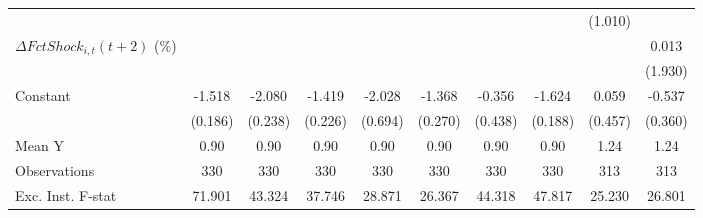 {\begin{tabular}{l*{9}{c}}
                    &                     &                     &                     &                     &                     &                     &                     &     (1.010)         &                     \\
\addlinespace
$ \Delta FctShock_{i,t}(t+2)$ (\%)&                     &                     &                     &                     &                     &                     &                     &                     &       0.013         \\
                    &                     &                     &                     &                     &                     &                     &                     &                     &     (1.930)         \\
\addlinespace
Constant            &      -1.518\sym{***}&      -2.080\sym{***}&      -1.419\sym{***}&      -2.028\sym{***}&      -1.368\sym{***}&      -0.356         &      -1.624\sym{***}&       0.059         &      -0.537         \\
                    &     (0.186)         &     (0.238)         &     (0.226)         &     (0.694)         &     (0.270)         &     (0.438)         &     (0.188)         &     (0.457)         &     (0.360)         \\
\midrule
Mean Y              &        0.90         &        0.90         &        0.90         &        0.90         &        0.90         &        0.90         &        0.90         &        1.24         &        1.24         \\
Observations        &         330         &         330         &         330         &         330         &         330         &         330         &         330         &         313         &         313         \\
Exc. Inst. F-stat   &      71.901         &      43.324         &      37.746         &      28.871         &      26.367         &      44.318         &      47.817         &      25.230         &      26.801         \\
\bottomrule
\end{tabular}
}
